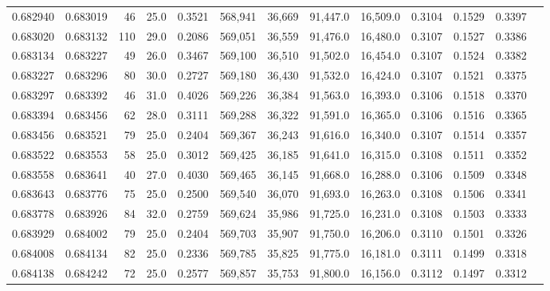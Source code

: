 \begin{tabular}{rrrrrrrrrrrrr}
0.682940 & 0.683019 &    46 & 25.0 &                                     0.3521 & 568,941 &  36,669 &  91,447.0 &  16,509.0 & 0.3104 & 0.1529 & 0.3397 \\
0.683020 & 0.683132 &   110 & 29.0 &                                     0.2086 & 569,051 &  36,559 &  91,476.0 &  16,480.0 & 0.3107 & 0.1527 & 0.3386 \\
0.683134 & 0.683227 &    49 & 26.0 &                                     0.3467 & 569,100 &  36,510 &  91,502.0 &  16,454.0 & 0.3107 & 0.1524 & 0.3382 \\
0.683227 & 0.683296 &    80 & 30.0 &                                     0.2727 & 569,180 &  36,430 &  91,532.0 &  16,424.0 & 0.3107 & 0.1521 & 0.3375 \\
0.683297 & 0.683392 &    46 & 31.0 &                                     0.4026 & 569,226 &  36,384 &  91,563.0 &  16,393.0 & 0.3106 & 0.1518 & 0.3370 \\
0.683394 & 0.683456 &    62 & 28.0 &                                     0.3111 & 569,288 &  36,322 &  91,591.0 &  16,365.0 & 0.3106 & 0.1516 & 0.3365 \\
0.683456 & 0.683521 &    79 & 25.0 &                                     0.2404 & 569,367 &  36,243 &  91,616.0 &  16,340.0 & 0.3107 & 0.1514 & 0.3357 \\
0.683522 & 0.683553 &    58 & 25.0 &                                     0.3012 & 569,425 &  36,185 &  91,641.0 &  16,315.0 & 0.3108 & 0.1511 & 0.3352 \\
0.683558 & 0.683641 &    40 & 27.0 &                                     0.4030 & 569,465 &  36,145 &  91,668.0 &  16,288.0 & 0.3106 & 0.1509 & 0.3348 \\
0.683643 & 0.683776 &    75 & 25.0 &                                     0.2500 & 569,540 &  36,070 &  91,693.0 &  16,263.0 & 0.3108 & 0.1506 & 0.3341 \\
0.683778 & 0.683926 &    84 & 32.0 &                                     0.2759 & 569,624 &  35,986 &  91,725.0 &  16,231.0 & 0.3108 & 0.1503 & 0.3333 \\
0.683929 & 0.684002 &    79 & 25.0 &                                     0.2404 & 569,703 &  35,907 &  91,750.0 &  16,206.0 & 0.3110 & 0.1501 & 0.3326 \\
0.684008 & 0.684134 &    82 & 25.0 &                                     0.2336 & 569,785 &  35,825 &  91,775.0 &  16,181.0 & 0.3111 & 0.1499 & 0.3318 \\
0.684138 & 0.684242 &    72 & 25.0 &                                     0.2577 & 569,857 &  35,753 &  91,800.0 &  16,156.0 & 0.3112 & 0.1497 & 0.3312 \\

\end{tabular}
